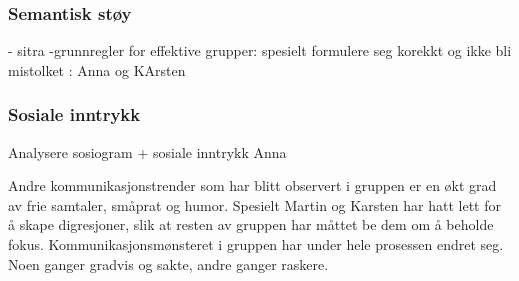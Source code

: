 \subsubsection{Semantisk støy}
 - sitra
 -grunnregler for effektive grupper: spesielt formulere seg korekkt og ikke bli mistolket : Anna og KArsten
 
\subsubsection{Sosiale inntrykk}

Analysere sosiogram + sosiale inntrykk Anna

Andre kommunikasjonstrender som har blitt observert i gruppen er en økt grad av frie samtaler, småprat og humor. Spesielt Martin og Karsten har hatt lett for å skape digresjoner, slik at resten av gruppen har måttet be dem om å beholde fokus. 
Kommunikasjonsmønsteret i gruppen har under hele prosessen endret seg.
Noen ganger gradvis og sakte, andre ganger raskere. 




























